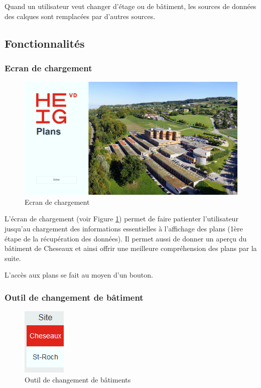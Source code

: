 \documentclass[
    iai, %
    il, %
]{heig-tb}
\begin{document}
Quand un utilisateur veut changer d'étage ou de bâtiment, les sources de données des calques sont remplacées par d'autres sources.

\subsection{Fonctionnalités}

\subsubsection{Ecran de chargement}

\begin{figure}[h]
    \centering
    \includegraphics[scale=0.3]{frontend-loading-screen.png}
    \caption{Ecran de chargement}
    \label{fig:ecran-chargement}
\end{figure}

L'écran de chargement (voir Figure \ref{fig:ecran-chargement}) permet de faire patienter l'utilisateur jusqu'au chargement des informations essentielles à l'affichage des plans
(1ère étape de la récupération des données).
Il permet aussi de donner un aperçu du bâtiment de Cheseaux et ainsi offrir une meilleure compréhension des plans par la suite.

L'accès aux plans se fait au moyen d'un bouton.

\subsubsection{Outil de changement de bâtiment}

\begin{figure}[h]
    \centering
    \includegraphics[scale=0.8]{frontend-buildingChange.png}
    \caption{Outil de changement de bâtiments}
    \label{fig:changement-batiment}
\end{figure}
\end{document}

